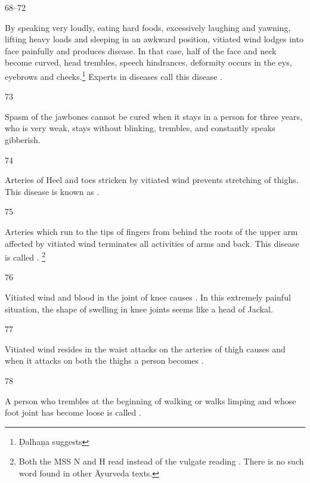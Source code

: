 \begin{translation}
\item[68--72]

	By speaking very loudly, eating hard foods, excessively laughing and
	yawning, lifting heavy loads and sleeping in an awkward position,
	vitiated wind lodges into face painfully and produces
	 disease. In that case, half of
	the face and neck become curved, head trembles, speech hindrances,
	deformity occurs in the eys, eyebrows and cheeks.\footnote{Ḍalhaṇa
	suggests } Experts in
	diseases call this disease . 

\item[73]

	Spasm of the jawbones cannot be cured when it stays in a person for
	three years, who is very weak, stays without blinking, trembles, and
	constantly speaks gibberish.

\item[74]

	Arteries of Heel and toes stricken by vitiated wind prevents stretching
	of thighs. This disease is known as .

\item[75]

	Arteries which run to the tips of fingers from behind the roots of the
	upper arm affected by vitiated wind terminates all activities of arms
	and back.  This disease is called . \footnote{Both the MSS N and H read  instead of the
	vulgate reading . There is no such word found in other
	Āyurveda texts.}

\item[76]

	Vitiated wind and blood in the joint of knee causes
	. In this extremely painful
	situation, the shape of swelling in knee joints seems like a head of
	Jackal. 

\item[77]

	Vitiated wind resides in the waist attacks on the arteries of thigh
	causes  and when it attacks on both the thighs a
	person becomes .

\item[78]

	A person who trembles at the beginning of walking or walks limping and
	whose foot joint has become loose is called
	.


\end{translation}
